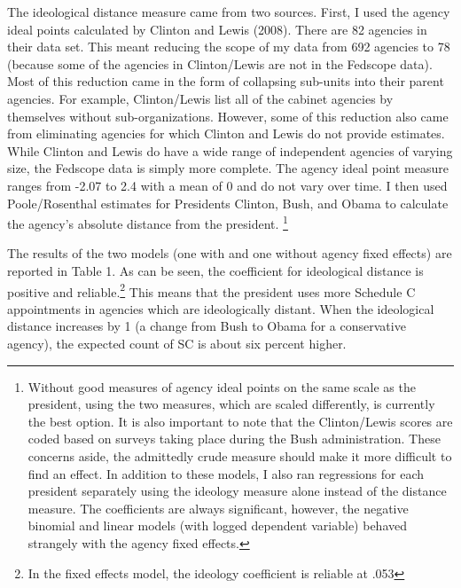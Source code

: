 \documentclass[12pt]{article}
\begin{document}
The ideological distance measure came from two sources. First, I used the agency ideal points calculated by Clinton and Lewis (2008). There are 82 agencies in their data set. This meant reducing the scope of my data from 692 agencies to 78 (because some of the agencies in Clinton/Lewis are not in the Fedscope data). Most of this reduction came in the form of collapsing sub-units into their parent agencies. For example, Clinton/Lewis list all of the cabinet agencies by themselves without sub-organizations. However, some of this reduction also came from eliminating agencies for which Clinton and Lewis do not provide estimates. While Clinton and Lewis do have a wide range of independent agencies of varying size, the Fedscope data is simply more complete. The agency ideal point measure ranges from -2.07 to 2.4 with a mean of 0 and do not vary over time. I then used Poole/Rosenthal estimates for Presidents Clinton, Bush, and Obama to calculate the agency's absolute distance from the president. \footnote{Without good measures of agency ideal points on the same scale as the president, using the two measures, which are scaled differently, is currently the best option. It is also important to note that the Clinton/Lewis scores are coded based on surveys taking place during the Bush administration. These concerns aside, the admittedly crude measure should make it more difficult to find an effect. In addition to these models, I also ran regressions for each president separately using the ideology measure alone instead of the distance measure. The coefficients are always significant, however, the negative binomial and linear models (with logged dependent variable) behaved strangely with the agency fixed effects.}

The results of the two models (one with and one without agency fixed effects) are reported in Table 1. As can be seen, the coefficient for ideological distance is positive and reliable.\footnote{In the fixed effects model, the ideology coefficient is reliable at .053} This means that the president uses more Schedule C appointments in agencies which are ideologically distant. When the ideological distance increases by 1 (a change from Bush to Obama for a conservative agency), the expected count of SC is about six percent higher.
\end{document}
